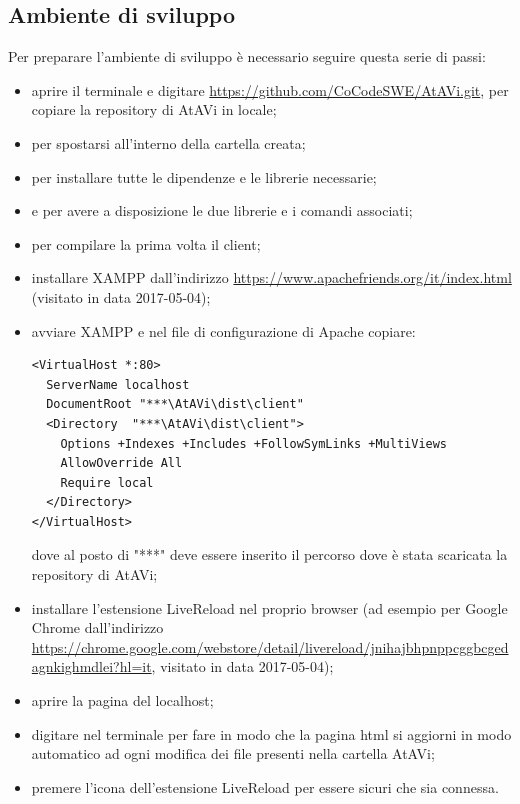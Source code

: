 \subsection{Ambiente di sviluppo}\label{Sviluppo}
Per preparare l'ambiente di sviluppo è necessario seguire questa serie di passi:
\begin{itemize}
	\item aprire il terminale e digitare  \url{https://github.com/CoCodeSWE/AtAVi.git}, per copiare la repository di AtAVi in locale;
	\item {} per spostarsi all'interno della cartella creata;
	\item {} per installare tutte le dipendenze e le librerie necessarie;
	\item {} e  per avere a disposizione le due librerie e i comandi associati;
	\item {} per compilare la prima volta il client;
	\item installare XAMPP dall'indirizzo \url{https://www.apachefriends.org/it/index.html} (visitato in data 2017-05-04);
	\item avviare XAMPP e nel file di configurazione di Apache copiare: \\
\begin{lstlisting}
<VirtualHost *:80> 
  ServerName localhost 
  DocumentRoot "***\AtAVi\dist\client" 
  <Directory  "***\AtAVi\dist\client"> 
    Options +Indexes +Includes +FollowSymLinks +MultiViews 
    AllowOverride All 
    Require local
  </Directory> 
</VirtualHost> 
\end{lstlisting}
dove al posto di "***" deve essere inserito il percorso dove è stata scaricata la repository di AtAVi;
	\item installare l'estensione LiveReload nel proprio browser (ad esempio per Google Chrome dall'indirizzo \url{https://chrome.google.com/webstore/detail/livereload/jnihajbhpnppcggbcgedagnkighmdlei?hl=it}, visitato in data 2017-05-04);
	\item aprire la pagina del localhost;
	\item digitare  nel terminale per fare in modo che la pagina html si aggiorni in modo automatico ad ogni modifica dei file presenti nella cartella AtAVi;
	\item premere l'icona dell'estensione LiveReload per essere sicuri che sia connessa.
\end{itemize}